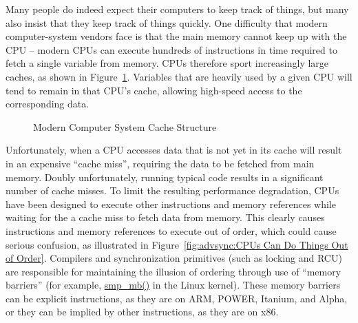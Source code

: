 Many people do indeed expect their computers to keep track of things,
but many also insist that they keep track of things quickly.
One difficulty that modern computer-system vendors face is that
the main memory cannot keep up with the CPU -- modern CPUs can execute
hundreds of instructions in time required to fetch a single variable
from memory.
CPUs therefore sport increasingly large caches, as shown in
Figure~\ref{fig:advsync:Modern Computer System Cache Structure}.
Variables that are heavily used by a given CPU will tend to remain
in that CPU's cache, allowing high-speed access to the corresponding
data.

\begin{figure}[htb]
\begin{center}
\end{center}
\caption{Modern Computer System Cache Structure}
\label{fig:advsync:Modern Computer System Cache Structure}
\end{figure}

Unfortunately, when a CPU accesses data that is not yet in its cache
will result in an expensive ``cache miss'', requiring the data to
be fetched from main memory.
Doubly unfortunately, running typical code results in a significant
number of cache misses.
To limit the resulting performance degradation, CPUs have been designed to
execute other instructions and memory references while waiting for the
a cache miss to fetch data from memory.
This clearly causes instructions and memory references to execute out
of order, which could cause serious confusion, as illustrated in
Figure~\ref{fig:advsync:CPUs Can Do Things Out of Order}.
Compilers and synchronization primitives (such as locking and RCU)
are responsible for maintaining the illusion of ordering through use of
``memory barriers'' (for example, \url{smp_mb()} in the Linux kernel).
These memory barriers can be explicit instructions, as they are on
ARM, POWER, Itanium, and Alpha, or they can be implied by other instructions,
as they are on x86.

